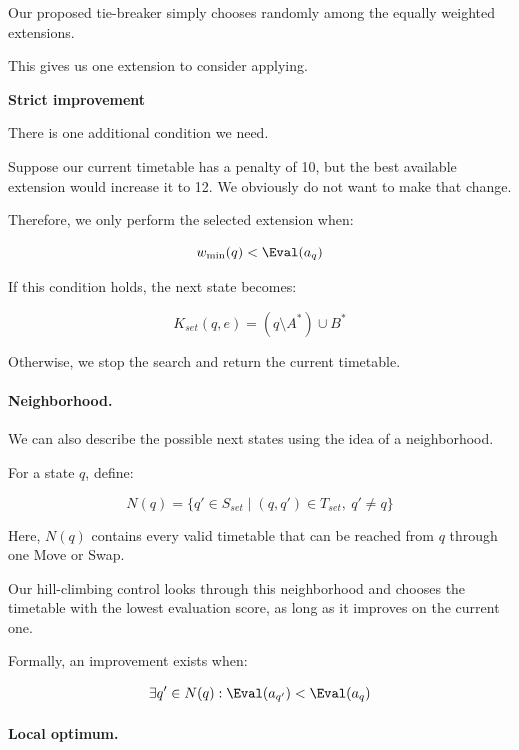 Our proposed tie-breaker simply chooses randomly among the equally weighted extensions.

This gives us one extension to consider applying.

\textbf{Strict improvement}

There is one additional condition we need.

Suppose our current timetable has a penalty of 10, but the best available extension would increase it to 12. We obviously do not want to make that change.

Therefore, we only perform the selected extension when:

\begin{equation}
    w_{\min}(q)<\Eval(a_q)
\end{equation}

If this condition holds, the next state becomes:

\begin{equation}
    K_{set}(q,e)=
    (q\setminus A^*)\cup B^*
\end{equation}

Otherwise, we stop the search and return the current timetable.

\paragraph{Neighborhood.}

We can also describe the possible next states using the idea of a neighborhood.

For a state $q$, define:

\begin{equation}
    N(q)=
    \{q'\in S_{set}\mid
    (q,q')\in T_{set},\ q'\neq q\}
\end{equation}

Here, $N(q)$ contains every valid timetable that can be reached from $q$ through one Move or Swap.

Our hill-climbing control looks through this neighborhood and chooses the timetable with the lowest evaluation score, as long as it improves on the current one.

Formally, an improvement exists when:

\begin{equation}
    \exists q'\in N(q):
    \Eval(a_{q'})<\Eval(a_q)
\end{equation}

\paragraph{Local optimum.}

